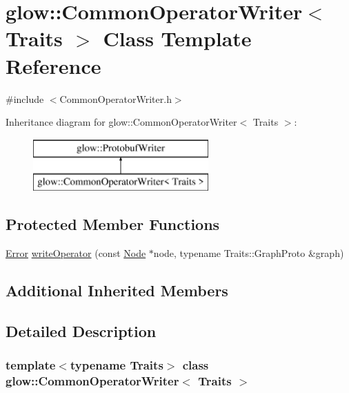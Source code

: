 \hypertarget{classglow_1_1_common_operator_writer}{}\section{glow\+:\+:Common\+Operator\+Writer$<$ Traits $>$ Class Template Reference}
\label{classglow_1_1_common_operator_writer}


{\ttfamily \#include $<$Common\+Operator\+Writer.\+h$>$}

Inheritance diagram for glow\+:\+:Common\+Operator\+Writer$<$ Traits $>$\+:\begin{figure}[H]
\begin{center}
\leavevmode
\includegraphics[height=2.000000cm]{classglow_1_1_common_operator_writer}
\end{center}
\end{figure}
\subsection*{Protected Member Functions}
\begin{DoxyCompactItemize}
\item 
\hyperlink{namespaceglow_afdb176c3a672ef66db0ecfc19a8d39bf}{Error} \hyperlink{classglow_1_1_common_operator_writer_a5b62bfd291a1f6182a3882657686ccb9}{write\+Operator} (const \hyperlink{classglow_1_1_node}{Node} $\ast$node, typename Traits\+::\+Graph\+Proto \&graph)
\end{DoxyCompactItemize}
\subsection*{Additional Inherited Members}


\subsection{Detailed Description}
\subsubsection*{template$<$typename Traits$>$\newline
class glow\+::\+Common\+Operator\+Writer$<$ Traits $>$}

